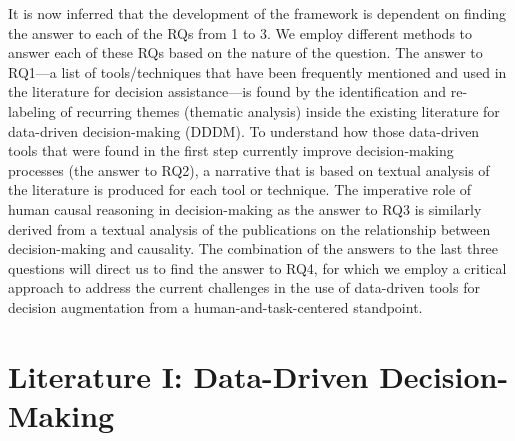 \documentclass{sfuthesis}
\begin{document}
It is now inferred that the development of the framework is dependent on finding the answer to each of the RQs from 1 to 3. We employ different methods to answer each of these RQs based on the nature of the question. The answer to RQ1—a list of tools/techniques that have been frequently mentioned and used in the literature for decision assistance—is found by the identification and re-labeling of recurring themes (thematic analysis) inside the existing literature for data-driven decision-making (DDDM). To understand how those data-driven tools that were found in the first step currently improve decision-making processes (the answer to RQ2), a narrative that is based on textual analysis of the literature is produced for each tool or technique. The imperative role of human causal reasoning in decision-making as the answer to RQ3 is similarly derived from a textual analysis of the publications on the relationship between decision-making and causality. The combination of the answers to the last three questions will direct us to find the answer to RQ4, for which we employ a critical approach to address the current challenges in the use of data-driven tools for decision augmentation from a human-and-task-centered standpoint. 

\chapter{Literature I: Data-Driven Decision-Making}
\end{document}
